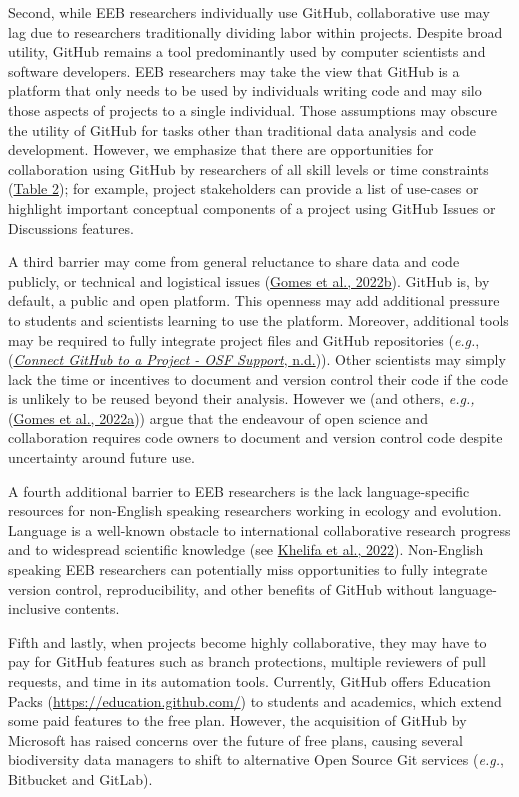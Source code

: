 Second, while EEB researchers individually use GitHub, collaborative use may lag due to researchers traditionally dividing labor within projects.
Despite broad utility, GitHub remains a tool predominantly used by computer scientists and software developers.
EEB researchers may take the view that GitHub is a platform that only needs to be used by individuals writing code and may silo those aspects of projects to a single individual.
Those assumptions may obscure the utility of GitHub for tasks other than traditional data analysis and code development.
However, we emphasize that there are opportunities for collaboration using GitHub by researchers of all skill levels or time constraints (\protect\hyperlink{tbl:roles}{Table 2}); for example, project stakeholders can provide a list of use-cases or highlight important conceptual components of a project using GitHub Issues or Discussions features.

A third barrier may come from general reluctance to share data and code publicly, or technical and logistical issues (\protect\hyperlink{ref-pq2Tv1BC}{Gomes et al., 2022b}).
GitHub is, by default, a public and open platform.
This openness may add additional pressure to students and scientists learning to use the platform.
Moreover, additional tools may be required to fully integrate project files and GitHub repositories (\emph{e.g.}, (\protect\hyperlink{ref-lx49NGto}{\emph{Connect GitHub to a Project - OSF Support}, n.d.})).
Other scientists may simply lack the time or incentives to document and version control their code if the code is unlikely to be reused beyond their analysis.
However we (and others, \emph{e.g.,} (\protect\hyperlink{ref-VDJput1V}{Gomes et al., 2022a})) argue that the endeavour of open science and collaboration requires code owners to document and version control code despite uncertainty around future use.

A fourth additional barrier to EEB researchers is the lack language-specific resources for non-English speaking researchers working in ecology and evolution.
Language is a well-known obstacle to international collaborative research progress and to widespread scientific knowledge (see \protect\hyperlink{ref-cW7vGddM}{Khelifa et al., 2022}).
Non-English speaking EEB researchers can potentially miss opportunities to fully integrate version control, reproducibility, and other benefits of GitHub without language-inclusive contents.

Fifth and lastly, when projects become highly collaborative, they may have to pay for GitHub features such as branch protections, multiple reviewers of pull requests, and time in its automation tools.
Currently, GitHub offers Education Packs (\url{https://education.github.com/}) to students and academics, which extend some paid features to the free plan.
However, the acquisition of GitHub by Microsoft has raised concerns over the future of free plans, causing several biodiversity data managers to shift to alternative Open Source Git services (\emph{e.g.}, Bitbucket and GitLab).

